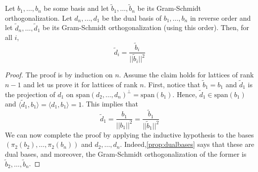 \begin{proposition} 
  Let $b_1,\dots,b_n$ be some basis and let $\tilde{b}_1,\dots,\tilde{b}_n$
  be its Gram-Schmidt orthogonalization. Let $d_n,\dots,d_1$ be the dual basis
  of $b_1,\dots,b_n$ in reverse order and let $\tilde{d}_n,\dots,\tilde{d}_1$
  be its Gram-Schmidt orthogonalization (using this order). Then, for all $i$,
  \begin{equation}
  \tilde{d}_i = \frac{\tilde{b}_i}{||\tilde{b}_i||^2}
\end{equation}
\label{prop:gramshmidt}
\end{proposition}
\begin{proof}
  The proof is by induction on $n$. Assume the claim holds for lattices of rank
  $n-1$ and let us prove it for lattices of rank $n$. First, notice that
  $\tilde{b}_1 = b_1$ and $\tilde{d}_1$ is the projection of $d_1$ on
  $\mathrm{span}(d_2,\dots,d_n)^\perp = \mathrm{span}(b_1)$. Hence,
  $\tilde{d}_1\in\mathrm{span}(b_1)$ and $\langle\tilde{d}_1,b_1\rangle
  = \langle d_1,b_1\rangle = 1$. This implies that
  \begin{equation}
    \tilde{d}_1 = \frac{b_1}{||b_1||^2}=  \frac{\tilde{b}_1}{||\tilde{b}_1||^2}
  \end{equation}
  We can now complete the proof by applying the inductive hypothesis to the
  bases $(\pi_2(b_2), \dots, \pi_2(b_n))$ and $d_2,\dots,d_n$.
  Indeed,\ref{prop:dualbases} says that these are dual bases, and moreover, the 
  Gram-Schmidt orthogonalization of the  former is
  $\tilde{b}_2,\dots,\tilde{b}_n$.
\end{proof}
